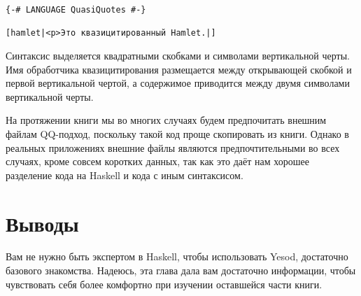 \begin{lstlisting}
{-# LANGUAGE QuasiQuotes #-}

[hamlet|<p>Это квазицитированный Hamlet.|]
\end{lstlisting}

Синтаксис выделяется квадратными скобками и символами вертикальной черты. Имя обработчика квазицитирования размещается между открывающей скобкой и первой вертикальной чертой, а содержимое приводится между двумя символами вертикальной черты.

На протяжении книги мы во многих случаях будем предпочитать внешним файлам QQ-подход, поскольку такой код проще скопировать из книги. Однако в реальных приложениях внешние файлы являются предпочтительными во всех случаях, кроме совсем коротких данных, так как это даёт нам хорошее разделение кода на Haskell и кода с иным синтаксисом.

\section{Выводы}

Вам не нужно быть экспертом в Haskell, чтобы использовать Yesod, достаточно базового знакомства. Надеюсь, эта глава дала вам достаточно информации, чтобы чувствовать себя более комфортно при изучении оставшейся части книги.
